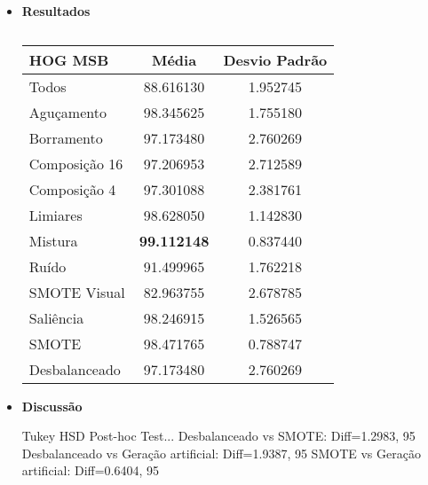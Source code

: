 \begin{itemize}
\item[] \textbf{Resultados}

\begin{table}[!htbp]
\centering
\caption{}
\label{tab:resultados:4.1}
\begin{tabular}{|l|c|c|}
\hline
\textbf{HOG MSB} & \textbf{Média}     & \textbf{Desvio Padrão} \\ \hline
   Todos        &  88.616130 &  1.952745  \\ \hline
  Aguçamento    &  98.345625 &  1.755180  \\ \hline
  Borramento    &  97.173480 &  2.760269  \\ \hline
  Composição 16 &  97.206953 &  2.712589  \\ \hline
  Composição 4  &  97.301088 &  2.381761  \\ \hline
  Limiares      &  98.628050 &  1.142830  \\ \hline
  Mistura       &  \textbf{99.112148} &  0.837440  \\ \hline
  Ruído         &  91.499965 &  1.762218  \\ \hline
  SMOTE Visual  &  82.963755 &  2.678785  \\ \hline
  Saliência     &  98.246915 &  1.526565  \\ \hline
 SMOTE          &  98.471765 &  0.788747  \\ \hline
Desbalanceado   &  97.173480 &  2.760269  \\ \hline
\end{tabular}
\end{table}

\item[] \textbf{Discussão}

Tukey HSD Post-hoc Test...
Desbalanceado vs SMOTE: Diff=1.2983, 95%
Desbalanceado vs Geração artificial: Diff=1.9387, 95%
SMOTE vs Geração artificial: Diff=0.6404, 95%

\end{itemize}

